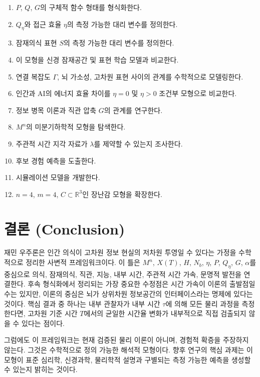 \documentclass[11pt]{article}
\theoremstyle{remark}
\begin{document}
\begin{enumerate}[leftmargin=2em]
  \item $P$, $Q$, $G$의 구체적 함수 형태를 형식화한다.
  \item $Q_\eta$와 접근 효율 $\eta$의 측정 가능한 대리 변수를 정의한다.
  \item 잠재의식 표현 $S$의 측정 가능한 대리 변수를 정의한다.
  \item 이 모형을 신경 잠재공간 및 표현 학습 모델과 비교한다.
  \item 연결 복잡도 $\Gamma$, 뇌 가소성, 고차원 표현 사이의 관계를
  수학적으로 모델링한다.
  \item 인간과 AI의 에너지 효율 차이를 $\eta=0$ 및 $\eta>0$ 조건부 모형으로
  비교한다.
  \item 정보 병목 이론과 직관 압축 $G$의 관계를 연구한다.
  \item $M^n$의 미분기하학적 모형을 탐색한다.
  \item 주관적 시간 지각 자료가 $\lambda$를 제약할 수 있는지 조사한다.
  \item 후보 경험 예측을 도출한다.
  \item 시뮬레이션 모델을 개발한다.
  \item $n=4$, $m=4$, $C\subset\mathbb{R}^3$인 장난감 모형을 확장한다.
\end{enumerate}

\section{결론 (Conclusion)}

재민 우주론은 인간 의식이 고차원 정보 현실의 저차원 투영일 수 있다는
가정을 수학적으로 정리한 사변적 프레임워크이다. 이 틀은 $M^n$, $X(T)$,
$H$, $N_b$, $\eta$, $P$, $Q_\eta$, $G$, $\alpha$를 중심으로 의식,
잠재의식, 직관, 지능, 내부 시간, 주관적 시간 가속, 문명적 발전을 연결한다.
후속 형식화에서 정리되는 가장 중요한 수정점은 시간 가속이 이론의 출발점일 수는
있지만, 이론의 중심은 뇌가 상위차원 정보공간의 인터페이스라는 명제에
있다는 것이다. 핵심 결과 중 하나는 내부 관찰자가 내부 시간 $\tau$에 의해
모든 물리 과정을 측정한다면, 고차원 기준 시간 $T$에서의 균일한 시간율
변화가 내부적으로 직접 검출되지 않을 수 있다는 점이다.

그럼에도 이 프레임워크는 현재 검증된 물리 이론이 아니며, 경험적 확증을
주장하지 않는다. 그것은 수학적으로 정의 가능한 해석적 모형이다. 향후
연구의 핵심 과제는 이 모형이 표준 심리학, 신경과학, 물리학적 설명과
구별되는 측정 가능한 예측을 생성할 수 있는지 밝히는 것이다.

\nocite{*}


\end{document}

